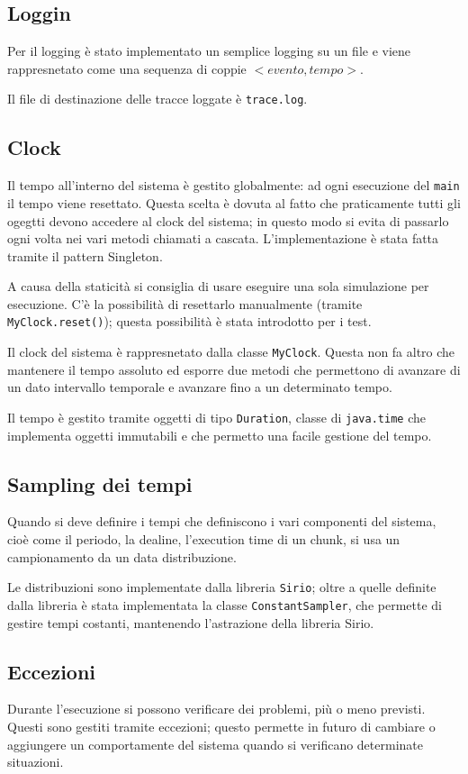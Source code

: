 \subsection{Loggin}
Per il logging è stato implementato un semplice logging su un file e viene rappresnetato come una sequenza di coppie $<evento,tempo>$.

Il file di destinazione delle tracce loggate è \texttt{trace.log}.

\subsection{Clock}
Il tempo all'interno del sistema è gestito globalmente: ad ogni esecuzione del \texttt{main} il tempo viene resettato. Questa scelta è dovuta al fatto che praticamente tutti gli ogegtti devono accedere al clock del sistema; in questo modo si evita di passarlo ogni volta nei vari metodi chiamati a cascata. L'implementazione è stata fatta tramite il pattern Singleton.

A causa della staticità si consiglia di usare eseguire una sola simulazione per esecuzione. C'è la possibilità di resettarlo manualmente (tramite \texttt{MyClock.reset()}); questa possibilità è stata introdotto per i test.

Il clock del sistema è rappresnetato dalla classe \texttt{MyClock}. Questa non fa altro che mantenere il tempo assoluto ed esporre due metodi che permettono di avanzare di un dato intervallo temporale e avanzare fino a un determinato tempo.

\myskip

Il tempo è gestito tramite oggetti di tipo \texttt{Duration}, classe di \texttt{java.time} che implementa oggetti immutabili e che permetto una facile gestione del tempo.

\subsection{Sampling dei tempi}
Quando si deve definire i tempi che definiscono i vari componenti del sistema, cioè come il periodo, la dealine, l'execution time di un chunk, si usa un campionamento da un data distribuzione.

Le distribuzioni sono implementate dalla libreria \texttt{Sirio}; oltre a quelle definite dalla libreria è stata implementata la classe \texttt{ConstantSampler}, che permette di gestire tempi costanti, mantenendo l'astrazione della libreria Sirio.

\subsection{Eccezioni}
Durante l'esecuzione si possono verificare dei problemi, più o meno previsti. Questi sono gestiti tramite eccezioni; questo permette in futuro di cambiare o aggiungere un comportamente del sistema quando si verificano determinate situazioni.

